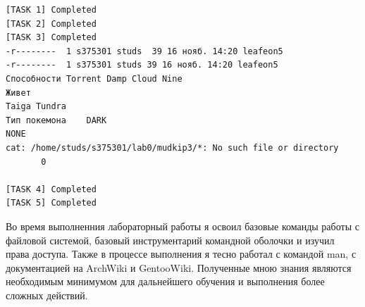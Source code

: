     \begin{lstlisting}[caption={Дерево файлов},label={lst:tree}]
[TASK 1] Completed
[TASK 2] Completed
[TASK 3] Completed
-r--------  1 s375301 studs  39 16 нояб. 14:20 leafeon5
-r--------  1 s375301 studs 39 16 нояб. 14:20 leafeon5
Способности	Torrent Damp Cloud Nine
Живет
Taiga Tundra
Тип покемона	DARK
NONE
cat: /home/studs/s375301/lab0/mudkip3/*: No such file or directory
       0

[TASK 4] Completed
[TASK 5] Completed
    \end{lstlisting}

    Во время выполненния лабораторный работы я освоил базовые команды работы с файловой системой, базовый инструментарий командной оболочки и изучил права доступа. Также в процессе выполнения я тесно работал с командой man, с документацией на ArchWiki\cite{archwiki} и GentooWiki\cite{gentoowiki}. Полученные мною знания являются необходимым минимумом для дальнейшего обучения и выполнения более сложных действий.
    \newpage





